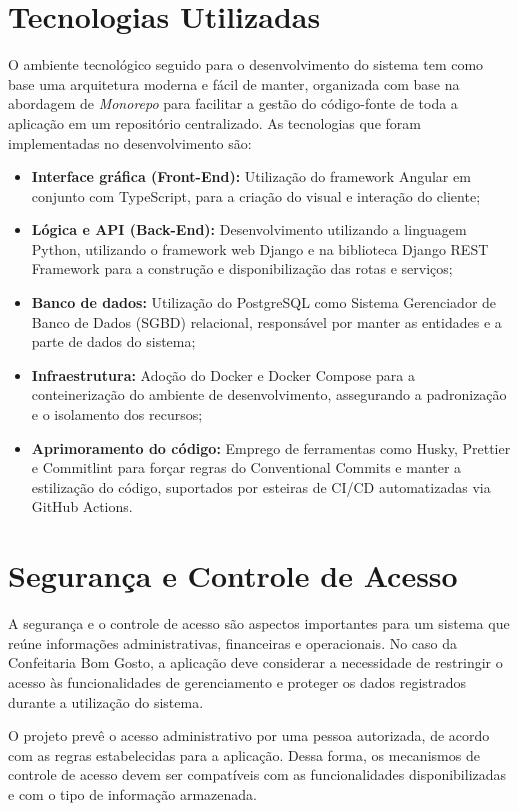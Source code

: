\section{Tecnologias Utilizadas}
O ambiente tecnológico seguido para o desenvolvimento do sistema tem como base uma arquitetura moderna e fácil de manter, organizada com base na abordagem de \textit{Monorepo} para facilitar a gestão do código-fonte de toda a aplicação em um repositório centralizado. As tecnologias que foram implementadas no desenvolvimento são:

\begin{itemize}
    \item \textbf{Interface gráfica (Front-End):} Utilização do framework Angular em conjunto com TypeScript, para a criação do visual e interação do cliente;
    \item \textbf{Lógica e API (Back-End):} Desenvolvimento utilizando a linguagem Python, utilizando o framework web Django e na biblioteca Django REST Framework para a construção e disponibilização das rotas e serviços;
    \item \textbf{Banco de dados:} Utilização do PostgreSQL como Sistema Gerenciador de Banco de Dados (SGBD) relacional, responsável por manter as entidades e a parte de dados do sistema;
    \item \textbf{Infraestrutura:} Adoção do Docker e Docker Compose para a conteinerização do ambiente de desenvolvimento, assegurando a padronização e o isolamento dos recursos;
    \item \textbf{Aprimoramento do código:} Emprego de ferramentas como Husky, Prettier e Commitlint para forçar regras do Conventional Commits e manter a estilização do código, suportados por esteiras de CI/CD automatizadas via GitHub Actions.
\end{itemize}

\section{Segurança e Controle de Acesso}

A segurança e o controle de acesso são aspectos importantes para um sistema que reúne informações administrativas, financeiras e operacionais. No caso da Confeitaria Bom Gosto, a aplicação deve considerar a necessidade de restringir o acesso às funcionalidades de gerenciamento e proteger os dados registrados durante a utilização do sistema.

O projeto prevê o acesso administrativo por uma pessoa autorizada, de acordo com as regras estabelecidas para a aplicação. Dessa forma, os mecanismos de controle de acesso devem ser compatíveis com as funcionalidades disponibilizadas e com o tipo de informação armazenada.


